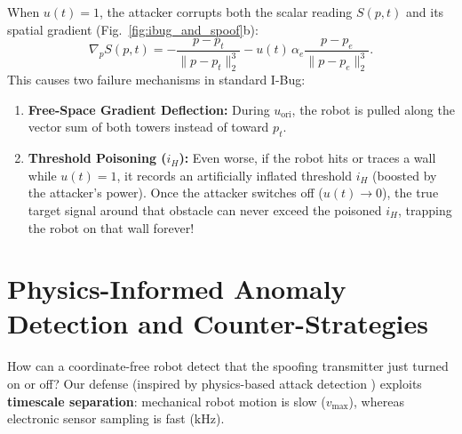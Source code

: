 \documentclass[11pt, a4paper]{article}
\begin{document}
When $u(t) = 1$, the attacker corrupts both the scalar reading $S(p, t)$ and its spatial gradient (Fig.~\ref{fig:ibug_and_spoof}b):
\begin{equation}
    \nabla_p S(p, t) = -\frac{p - p_t}{\|p - p_t\|_2^3} - u(t)\,\alpha_e \frac{p - p_e}{\|p - p_e\|_2^3}.
    \label{eq:corrupted_grad}
\end{equation}
This causes two failure mechanisms in standard I-Bug:
\begin{enumerate}
    \item \textbf{Free-Space Gradient Deflection:} During $u_{\text{ori}}$, the robot is pulled along the vector sum of both towers instead of toward $p_t$.
    \item \textbf{Threshold Poisoning ($i_H$):} Even worse, if the robot hits or traces a wall while $u(t) = 1$, it records an artificially inflated threshold $i_H$ (boosted by the attacker's power). Once the attacker switches off ($u(t) \to 0$), the true target signal around that obstacle can never exceed the poisoned $i_H$, trapping the robot on that wall forever!
\end{enumerate}

\section{Physics-Informed Anomaly Detection and Counter-Strategies}

How can a coordinate-free robot detect that the spoofing transmitter just turned on or off? Our defense (inspired by physics-based attack detection \cite{giraldo2018survey, basseville1993detection}) exploits \textbf{timescale separation}: mechanical robot motion is slow ($v_{\max}$), whereas electronic sensor sampling is fast ($\text{kHz}$).
\end{document}
